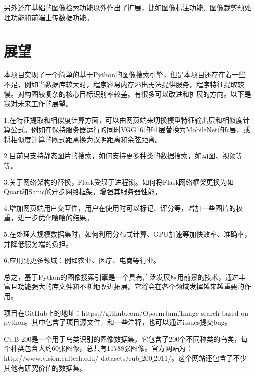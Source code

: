 \documentclass[bachelor_p]{hdu-thesis}
\begin{document}
另外还在基础的图像检索功能以外作出了扩展，比如图像标注功能、图像裁剪预处理功能和前端上传数据功能。

\section{展望}

本项目实现了一个简单的基于Python的图像搜索引擎，但是本项目还存在着一些不足，例如当数据库较大时，程序容易内存溢出无法提供服务，程序特征提取较慢。对构图较复杂的核心目标识别率较差。有很多可以改进和扩展的方向。以下是我对未来工作的展望。

1.在特征提取和相似度计算方面，可以由网页端来切换模型特征输出层和相似度计算公式。例如在保持服务器运行的同时VGG16的fc1层替换为MobileNet的fc层，或将相似度计算的欧式距离换为汉明距离和余弦距离。

2.目前只支持静态图片的搜索，如何支持更多种类的数据搜索，如动图、视频等等。

3.关于网络架构的替换，Flask受限于进程锁。如何将Flask网络框架更换为如Quart和Sanic的异步网络框架，增强其服务器性能。

4.增加网页端用户交互性，用户在使用时可以标记、评分等，增加一些图片的权重，进一步优化嗖嗖的结果。

5.在处理大规模数据集时，如何利用分布式计算、GPU加速等加快效率、准确率，并降低服务端的负担。

6.应用到更多领域：例如农业、医疗、电商等行业。

总之，基于Python的图像搜索引擎是一个具有广泛发展应用前景的技术，通过丰富且功能强大的库文件和不断地改进拓展，它将会在各个领域发挥越来越重要的作用。








 






%
%



\hduappendix
项目在GitHub上的地址：https://github.com/OpoemJam/Image-search-based-on-python。其中包含了项目源文件，和一些注释，也可以通过issues提交bug。

CUB-200是一个用于鸟类识别的图像数据集，它包含了200个不同种类的鸟类，每个种类包含大约60张图像，总共有11788张图像。官方网站为：http://www.vision.caltech.edu/
datasets/cub$\_$200$\_$2011/。这个网站还包含了不少其他有研究价值的数据集。
 

\end{document}
